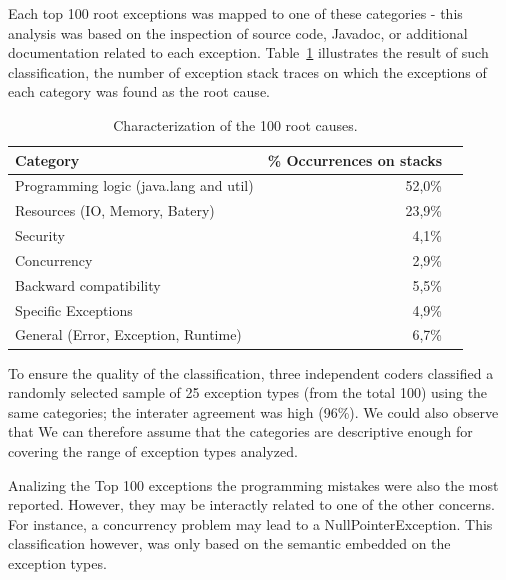 \documentclass[conference]{IEEEtran}
\begin{document}
Each top 100 root exceptions was mapped to one of these categories - 
this analysis was based on the inspection of source code, Javadoc, or additional 
documentation related to each exception.  Table~\ref{tab:tophundrend} 
illustrates the result of such classification, the number of exception stack traces
on which the exceptions of each category was found as the root cause.

\begin{table}
  \centering
  \begin{tabular}{lrr}
    \hline
    \bfseries{Category} &  \bfseries{\% Occurrences on stacks} \\
    \hline
      Programming logic (java.lang and util) &  52,0\%\\ 
      Resources (IO, Memory, Batery)       &   23,9\% \\ 
      Security                               &  4,1\%\\  
      Concurrency                            &  2,9\% \\ 
      Backward compatibility                 & 5,5\% \\ 
      Specific Exceptions               &  4,9\%\\ 
      General (Error, Exception, Runtime)    &  6,7\%\\
  \end{tabular}
  \caption{Characterization of the 100 root causes.}
  \label{tab:tophundrend}
\end{table}

To ensure the quality of the classification, three independent coders classified a randomly selected
sample of 25 exception types (from the total 100) using the same categories;
the interater agreement was high (96\%). We could also observe that
We can therefore assume that the categories are descriptive 
enough for covering the range of exception types analyzed.

Analizing the Top 100 exceptions the programming mistakes
were also the most reported. However, they may be interactly related 
to one of the other concerns. For  instance, a concurrency problem may 
lead to a NullPointerException. This classification however, 
was only based on the semantic embedded  on the exception types.

\noindent {}
\end{document}
